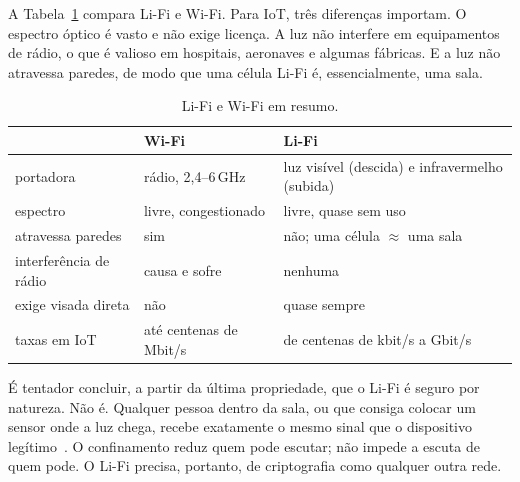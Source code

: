 A Tabela~\ref{tab:lifi-wifi} compara Li-Fi e Wi-Fi. Para IoT, três diferenças
importam. O espectro óptico é vasto e não exige licença. A luz não interfere em
equipamentos de rádio, o que é valioso em hospitais, aeronaves e algumas
fábricas. E a luz não atravessa paredes, de modo que uma célula Li-Fi é,
essencialmente, uma sala.

\begin{table}[!htb]
\caption{Li-Fi e Wi-Fi em resumo.}
\label{tab:lifi-wifi}
\centering
\small
\begin{tabular}{lll}
\toprule
 & Wi-Fi & Li-Fi\\
\midrule
portadora            & rádio, 2,4--6\,GHz & luz visível (descida) e infravermelho (subida)\\
espectro             & livre, congestionado & livre, quase sem uso\\
atravessa paredes    & sim & não; uma célula $\approx$ uma sala\\
interferência de rádio & causa e sofre & nenhuma\\
exige visada direta  & não & quase sempre\\
taxas em IoT         & até centenas de Mbit/s & de centenas de kbit/s a Gbit/s\\
\bottomrule
\end{tabular}
\end{table}

É tentador concluir, a partir da última propriedade, que o Li-Fi é seguro por
natureza. Não é. Qualquer pessoa dentro da sala, ou que consiga colocar um
sensor onde a luz chega, recebe exatamente o mesmo sinal que o dispositivo
legítimo~\cite{blinowski2019vlcsec,arfaoui2020plsvlc}. O confinamento reduz
quem pode escutar; não impede a escuta de quem pode. O Li-Fi precisa, portanto,
de criptografia como qualquer outra rede.

